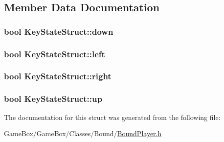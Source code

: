 \subsection{\-Member \-Data \-Documentation}
\hypertarget{struct_key_state_struct_aeda151e7db716720d5908f71bbebd762}{
\subsubsection[{down}]{\setlength{\rightskip}{0pt plus 5cm}bool {\bf \-Key\-State\-Struct\-::down}}}\label{struct_key_state_struct_aeda151e7db716720d5908f71bbebd762}
\hypertarget{struct_key_state_struct_a58af8e4068bce6dd66a29ba2b51ed96b}{
\subsubsection[{left}]{\setlength{\rightskip}{0pt plus 5cm}bool {\bf \-Key\-State\-Struct\-::left}}}\label{struct_key_state_struct_a58af8e4068bce6dd66a29ba2b51ed96b}
\hypertarget{struct_key_state_struct_a4edc7213073c8090360733c06949e3cd}{
\subsubsection[{right}]{\setlength{\rightskip}{0pt plus 5cm}bool {\bf \-Key\-State\-Struct\-::right}}}\label{struct_key_state_struct_a4edc7213073c8090360733c06949e3cd}
\hypertarget{struct_key_state_struct_a3d388e2382b981fef46bd0ac827f9a41}{
\subsubsection[{up}]{\setlength{\rightskip}{0pt plus 5cm}bool {\bf \-Key\-State\-Struct\-::up}}}\label{struct_key_state_struct_a3d388e2382b981fef46bd0ac827f9a41}


\-The documentation for this struct was generated from the following file\-:\begin{DoxyCompactItemize}
\item 
\-Game\-Box/\-Game\-Box/\-Classes/\-Bound/\hyperlink{_bound_player_8h}{\-Bound\-Player.\-h}\end{DoxyCompactItemize}
